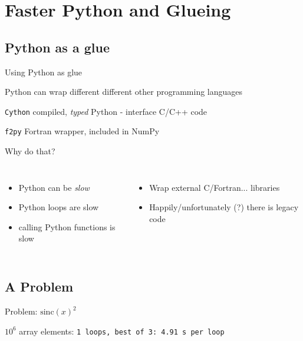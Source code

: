 \section{Faster Python and Glueing}

\subsection{Python as a glue}

\begin{frame}{Using Python as glue}

Python can wrap different different other programming languages\\[1ex]

\begin{exbox}{{\texttt{Cython}}}
    compiled, \emph{typed} Python - interface C/C++ code
\end{exbox}

\begin{exbox}{{\texttt{f2py}}}
    Fortran wrapper, included in NumPy
\end{exbox}

Why do that?
\begin{columns}
    
\begin{itemize}
    \item Python can be \emph{slow}
    \item Python loops are slow
    \item calling Python functions is slow
\end{itemize}

\begin{itemize}
    \item Wrap external C/Fortran... libraries
    \item Happily/unfortunately (?) there is legacy code
\end{itemize}

\end{columns}

\end{frame}

\subsection{A Problem}

\begin{frame}[fragile]{Problem: $\mathrm{sinc}(x)^{2}$}



\pause
$10^{6}$ array elements: {\texttt{1 loops, best of 3: 4.91 s per loop}}
\end{frame}


